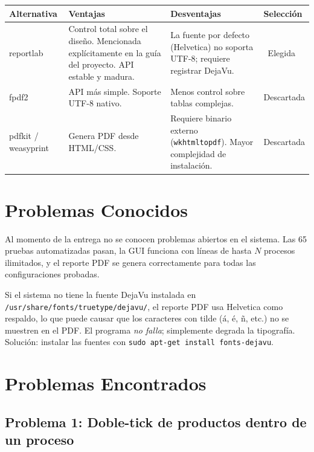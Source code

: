 \documentclass[12pt,letterpaper]{article}
\newcommand{\cmark}{\textcolor{accentgreen}{\ding{51}}}
\begin{document}
\begin{center}
\renewcommand{\arraystretch}{1.25}
\begin{tabularx}{\textwidth}{|l|X|X|C{1.8cm}|}
\hline
\textbf{Alternativa} & \textbf{Ventajas} & \textbf{Desventajas} & \textbf{Selección} \\
\hline
reportlab &
  Control total sobre el diseño. Mencionada explícitamente en la guía del proyecto. API estable y madura. &
  La fuente por defecto (Helvetica) no soporta UTF-8; requiere registrar DejaVu. &
  \cmark\ Elegida \\
\hline
fpdf2 &
  API más simple. Soporte UTF-8 nativo. &
  Menos control sobre tablas complejas. &
  Descartada \\
\hline
pdfkit / weasyprint &
  Genera PDF desde HTML/CSS. &
  Requiere binario externo (\texttt{wkhtmltopdf}). Mayor complejidad de instalación. &
  Descartada \\
\hline
\end{tabularx}
\end{center}

\section{Problemas Conocidos}

Al momento de la entrega no se conocen problemas abiertos en el sistema.
Las 65 pruebas automatizadas pasan, la GUI funciona con líneas de hasta $N$ procesos ilimitados,
y el reporte PDF se genera correctamente para todas las configuraciones probadas.

Si el sistema no tiene la fuente DejaVu instalada en
\texttt{/usr/share/fonts/truetype/dejavu/}, el reporte PDF usa Helvetica como
respaldo, lo que puede causar que los caracteres con tilde ($á$, $é$, $ñ$, etc.)
no se muestren en el PDF. El programa \emph{no falla}; simplemente degrada la
tipografía. Solución: instalar las fuentes con
\texttt{sudo apt-get install fonts-dejavu}.

\section{Problemas Encontrados}

\subsection{Problema 1: Doble-tick de productos dentro de un proceso}
\end{document}
